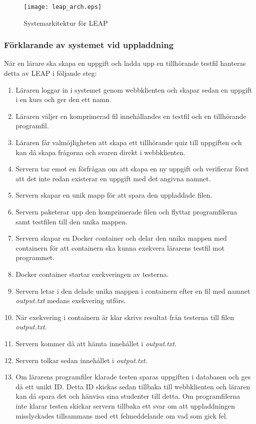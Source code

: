 \documentclass[a4paper,11pt]{article}
\begin{document}
{\begin{figure}[ht!]
\centering
\texttt{[image: leap\_arch.eps]}
\caption{Systemarkitektur för LEAP}
\label{fig:LeapArch}
\end{figure}

\newpage
\subsubsection{Förklarande av systemet vid uppladdning}

När en lärare ska skapa en uppgift och ladda upp en tillhörande testfil hanteras detta av LEAP i följande steg: 
\begin{enumerate}
\item
Läraren loggar in i systemet genom webbklienten och skapar sedan en uppgift i en kurs och ger den ett namn. 
\item
Läraren väljer en komprimerad fil innehållandes en testfil och en tillhörande programfil.
\item
Läraren får valmöjligheten att skapa ett tillhörande quiz till uppgiften och kan då skapa frågorna och svaren direkt i webbklienten.
\item
Servern tar emot en förfrågan om att skapa en ny uppgift och verifierar först att det inte redan existerar en uppgift med det angivna namnet.
\item
Servern skapar en unik mapp för att spara den uppladdade filen.
\item
Servern paketerar upp den komprimerade filen och flyttar programfilerna samt testfilen till den unika mappen.
\item
Servern skapar en Docker container och delar den unika mappen med containern för att containern ska kunna exekvera lärarens testfil mot programmet.
\item
Docker container startar exekveringen av testerna.
\item
Servern letar i den delade unika mappen i containern efter en fil med namnet \textit{output.txt} medans exekvering utförs.
\item
När exekvering i containern är klar skrivs resultat från testerna till filen \textit{output.txt}.
\item
Servern kommer då att hämta innehållet i \textit{output.txt}.
\item
Servern tolkar sedan innehållet i \textit{output.txt}.
\item
Om lärarens programfiler klarade testen sparas uppgiften i databasen och ges då ett unikt ID. Detta ID skickas sedan tillbaka till webbklienten och läraren kan då spara det och hänvisa sina studenter till detta. Om programfilerna inte klarar testen skickar servern tillbaka ett svar om att uppladdningen misslyckades tillsammans med ett felmeddelande om vad som gick fel.
\end{enumerate}

}
\end{document}
